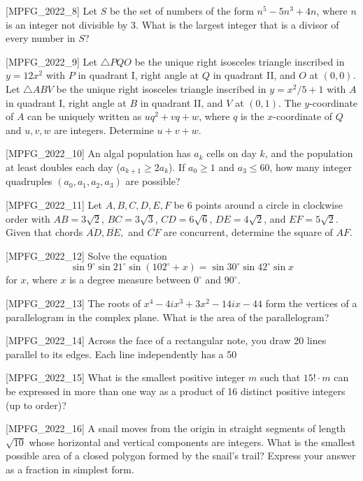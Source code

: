 [MPFG_2022_8]
Let $S$ be the set of numbers of the form $n^5 - 5n^3 + 4n$, where $n$ is an integer not divisible by 3. What is the largest integer that is a divisor of every number in $S$?

[MPFG_2022_9]
Let $\triangle PQO$ be the unique right isosceles triangle inscribed in $y=12x^2$ with $P$ in quadrant I, right angle at $Q$ in quadrant II, and $O$ at $(0,0)$. Let $\triangle ABV$ be the unique right isosceles triangle inscribed in $y=x^2/5+1$ with $A$ in quadrant I, right angle at $B$ in quadrant II, and $V$ at $(0,1)$. The $y$-coordinate of $A$ can be uniquely written as $u q^2 + v q + w$, where $q$ is the $x$-coordinate of $Q$ and $u, v, w$ are integers. Determine $u+v+w$.

[MPFG_2022_10]
An algal population has $a_k$ cells on day $k$, and the population at least doubles each day ($a_{k+1} \ge 2a_k$). If $a_0 \ge 1$ and $a_3 \le 60$, how many integer quadruples $(a_0, a_1, a_2, a_3)$ are possible?

[MPFG_2022_11]
Let $A, B, C, D, E, F$ be 6 points around a circle in clockwise order with $AB = 3\sqrt{2}$, $BC = 3\sqrt{3}$, $CD = 6\sqrt{6}$, $DE = 4\sqrt{2}$, and $EF = 5\sqrt{2}$. Given that chords $\overline{AD}, \overline{BE},$ and $\overline{CF}$ are concurrent, determine the square of $AF$.

[MPFG_2022_12]
Solve the equation
$$\sin 9^\circ \sin 21^\circ \sin(102^\circ + x) = \sin 30^\circ \sin 42^\circ \sin x$$
for $x$, where $x$ is a degree measure between $0^\circ$ and $90^\circ$.

[MPFG_2022_13]
The roots of $x^4 - 4ix^3 + 3x^2 - 14ix - 44$ form the vertices of a parallelogram in the complex plane. What is the area of the parallelogram?

[MPFG_2022_14]
Across the face of a rectangular note, you draw 20 lines parallel to its edges. Each line independently has a 50%

[MPFG_2022_15]
What is the smallest positive integer $m$ such that $15! \cdot m$ can be expressed in more than one way as a product of 16 distinct positive integers (up to order)?

[MPFG_2022_16]
A snail moves from the origin in straight segments of length $\sqrt{10}$ whose horizontal and vertical components are integers. What is the smallest possible area of a closed polygon formed by the snail's trail? Express your answer as a fraction in simplest form.

